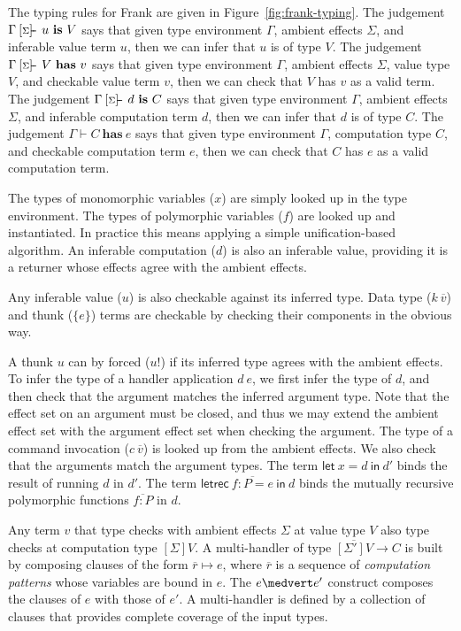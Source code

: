\documentclass[preprint]{sigplanconf}
\newcommand{\many}{\overline}
\newcommand{\judgeword}[1]{~\mathbf{#1}~}
\newcommand{\sigentails}[1]{\mathbin{[{\text{\scriptsize ${#1}$}}]\!\text{-\!-}}\,}
\newcommand{\makes}[4]  {#1 \sigentails{#2} {#3} \judgeword{is} {#4}}
\newcommand{\has}[4] {#1 \sigentails{#2} {#3} \judgeword{has} {#4}}
\newcommand{\can}[4]{#1 \sigentails{#2} {#3} \judgeword{is} {#4}}
\newcommand{\idoes}[3]{#1 \vdash {#2} \judgeword{has} {#3}}
\newcommand{\makesgs}{\makes{\Gamma}{\sigs}}
\newcommand{\hasgs}{\has{\Gamma}{\sigs}}
\newcommand{\cangs}{\can{\Gamma}{\sigs}}
\newcommand{\idoesg}{\idoes{\Gamma}}
\newcommand{\sigs}{\Sigma}
\newcommand{\effbox}[1]{[#1]}
\newcommand{\key}[1]{\mathsf{#1}}
\newcommand{\thunk}[1]{\{{#1}\}}
\begin{document}
The typing rules for Frank are given in Figure~\ref{fig:frank-typing}.
%
The judgement $\makesgs{u}{V}$ says that given type environment
$\Gamma$, ambient effects $\sigs$, and inferable value term $u$,
then we can infer that $u$ is of type $V$.
%
The judgement $\hasgs{V}{v}$ says that given type environment
$\Gamma$, ambient effects $\sigs$, value type $V$, and checkable
value term $v$, then we can check that $V$ has $v$ as a valid term.
%
The judgement $\cangs{d}{C}$ says that given type environment
$\Gamma$, ambient effects $\sigs$, and inferable computation term $d$,
then we can infer that $d$ is of type $C$.
%
The judgement $\idoesg{C}{e}$ says that given type environment
$\Gamma$, computation type $C$, and checkable computation term $e$,
then we can check that $C$ has $e$ as a valid computation term.

The types of monomorphic variables ($x$) are simply looked up in the
type environment. The types of polymorphic variables ($f$) are looked
up and instantiated. In practice this means applying a simple
unification-based algorithm.
%
An inferable computation ($d$) is also an inferable value, providing
it is a returner whose effects agree with the ambient effects.

Any inferable value ($u$) is also checkable against its inferred
type. Data type ($k~\many{v}$) and thunk ($\thunk{e}$) terms are
checkable by checking their components in the obvious way.

A thunk $u$ can by forced ($u!$) if its inferred type agrees with the
ambient effects. To infer the type of a handler application $d~e$, we
first infer the type of $d$, and then check that the argument matches
the inferred argument type. Note that the effect set on an argument
must be closed, and thus we may extend the ambient effect set with the
argument effect set when checking the argument.
%
The type of a command invocation ($c~\many{v}$) is looked up from the
ambient effects. We also check that the arguments match the argument
types.
%
The term $\key{let}~x=d~\key{in}~d'$ binds the result of running $d$
in $d'$.
%
The term $\key{letrec}~\many{f : P = e}~\key{in}~d$ binds the mutually
recursive polymorphic functions $\many{f:P}$ in $d$.

Any term $v$ that type checks with ambient effects $\sigs$ at value
type $V$ also type checks at computation type $\effbox{\sigs}V$.
%
A multi-handler of type $\many{\effbox{\sigs'}V} \to C$ is built by
composing clauses of the form $\many{r} \mapsto e$, where $\many{r}$
is a sequence of \emph{computation patterns} whose variables are bound
in $e$.
%
The $e \medvert e'$ construct composes the clauses of $e$ with those
of $e'$. A multi-handler is defined by a collection of clauses that
provides complete coverage of the input types.
\end{document}
